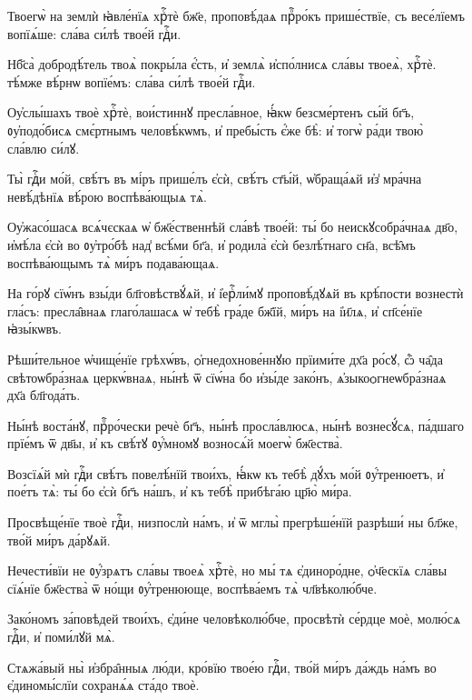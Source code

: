 \hKv Твоегѡ̀ на землѝ ꙗ҆вле́нїѧ хрⷭ҇тѐ бж҃е, проповѣ́даѧ  прⷪ҇ро́къ прише́ствїе, съ весе́лїемъ вопїѧ́ше: сла́ва си́лѣ  твое́й гдⷭ҇и. 

\hKv Нб҃са̀ добродѣ́тель твоѧ̀ покры́ла є҆́сть, и҆ землѧ̀  и҆спо́лнисѧ сла́вы твоеѧ̀, хрⷭ҇тѐ. тѣ́мже вѣ́рнѡ  вопїе́мъ: сла́ва си́лѣ твое́й гдⷭ҇и. 

\hKv Оу҆слы́шахъ твоѐ хрⷭ҇тѐ, вои́стиннꙋ пресла́вное, ꙗ҆́кѡ  безсме́ртенъ сы́й бг҃ъ, ᲂу҆подо́бисѧ смє́ртнымъ  человѣ́кѡмъ, и҆ пребы́сть є҆́же бѣ̀: и҆ тогѡ̀ ра́ди твою̀  сла́влю си́лꙋ. 
%

\hKv Ты̀ гдⷭ҇и мо́й, свѣ́тъ въ мі́ръ прише́лъ є҆сѝ, свѣ́тъ  ст҃ы́й, ѡ҆браща́ѧй и҆з̾ мра́чна невѣ́дѣнїѧ вѣ́рою  воспѣва́ющыѧ тѧ̀.  
%

\hKv Оу҆жасо́шасѧ всѧ́чєскаѧ ѡ҆  бж҃е́ственнѣй сла́вѣ твое́й: ты́ бо  неискꙋсобра́чнаѧ дв҃о, и҆мѣ́ла є҆сѝ во  ᲂу҆тро́бѣ над̾ всѣ́ми бг҃а, и҆ родила̀ є҆сѝ  безлѣ́тнаго сн҃а, всѣ̑мъ воспѣва́ющымъ тѧ̀ ми́ръ  подава́ющаѧ. 
%

\hKv На го́рꙋ сїѡ́нъ взы́ди бл҃говѣствꙋ́ѧй,  и҆ і҆ерⷭ҇ли́мꙋ проповѣ́дꙋѧй въ крѣ́пости вознестѝ гла́съ:  пресла̑внаѧ глаго́лашасѧ ѡ҆ тебѣ̀ гра́де бж҃їй, ми́ръ на  і҆и҃лѧ, и҆ сп҃се́нїе ꙗ҆зы́кѡвъ. 
%

\hKv Рѣши́тельное ѡ҆чище́нїе грѣхѡ́въ,  ѻ҆гнедохнове́ннꙋю прїими́те дх҃а ро́сꙋ, ѽ ча̑да  свѣтоѡбра́знаѧ церкѡ́внаѧ, ны́нѣ ѿ сїѡ́на бо и҆зы́де  зако́нъ, ѧ҆зыкоѻгнеѡбра́знаѧ дх҃а бл҃года́ть. 
%

\hKv Ны́нѣ воста́нꙋ, прⷪ҇ро́чески речѐ бг҃ъ, ны́нѣ  просла́влюсѧ, ны́нѣ вознесꙋ́сѧ, па́дшаго прїе́мъ ѿ дв҃ы,  и҆ къ свѣ́тꙋ ᲂу҆́мномꙋ возносѧ́й моегѡ̀ бж҃ества̀. 

\hKv Возсїѧ́й мѝ гдⷭ҇и свѣ́тъ повелѣ́нїй твои́хъ, ꙗ҆́кѡ къ  тебѣ̀ дꙋ́хъ мо́й ᲂу҆́тренюетъ, и҆ пое́тъ  тѧ̀: ты́ бо є҆сѝ бг҃ъ на́шъ, и҆ къ тебѣ̀  прибѣга́ю цр҃ю̀ ми́ра. 

\hKv Просвѣще́нїе твоѐ гдⷭ҇и, низпослѝ на́мъ, и҆ ѿ мглы̀  прегрѣше́нїй разрѣши́ ны бл҃же, тво́й ми́ръ да́рꙋѧй. 

\hKv Нечести́вїи не ᲂу҆́зрѧтъ сла́вы твоеѧ̀ хрⷭ҇тѐ, но мы́ тѧ  є҆диноро́дне, ѻ҆ч҃ескїѧ сла́вы сїѧ́нїе бж҃ества̀ ѿ но́щи  ᲂу҆́тренююще, воспѣва́емъ тѧ̀ чл҃вѣколю́бче. 

\hKv Зако́номъ за́повѣдей твои́хъ, є҆ди́не человѣколю́бче,  просвѣтѝ се́рдце моѐ, молю́сѧ гдⷭ҇и, и҆ поми́лꙋй мѧ̀. 

\hKv Стѧжа́вый ны̀ и҆збра̑нныѧ лю́ди, кро́вїю твое́ю гдⷭ҇и, тво́й  ми́ръ да́ждь на́мъ во є҆диномы́слїи сохранѧ́ѧ ста́до твоѐ. 
%

